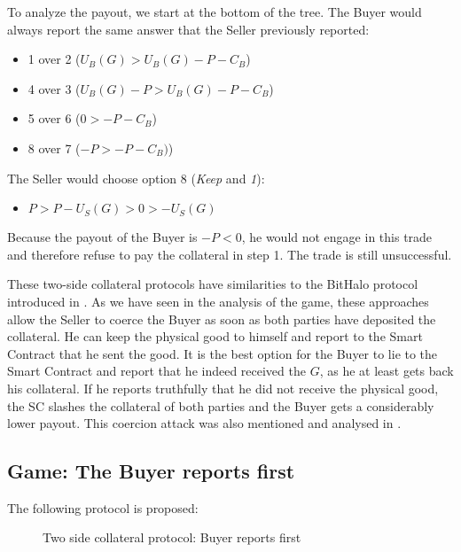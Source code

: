 \documentclass{cacthesis}
\begin{document}
To analyze the payout, we start at the bottom of the tree. The Buyer would always report the same answer that the Seller previously reported:
\begin{itemize}
    \item 1 over 2 ($U_B(G) > U_B(G) -P -C_B$)
    \item 4 over 3 ($U_B(G) - P > U_B(G) -P -C_B$)
    \item 5 over 6 ($0 > -P -C_B$)
    \item 8 over 7 ($-P > -P -C_B)$)
\end{itemize}
The Seller would choose option 8 (\emph{Keep} and \emph{1}):
\begin{itemize}
    \item $P>P-U_S(G)>0>-U_S(G)$
\end{itemize}
Because the payout of the Buyer is $-P<0$, he would not engage in this trade and therefore refuse to pay the collateral in step 1. The trade is still unsuccessful.\newline

These two-side collateral protocols have similarities to the BitHalo protocol introduced in \cite{zimbeck_two_nodate}. As we have seen in the analysis of the game, these approaches allow the Seller to coerce the Buyer as soon as both parties have deposited the collateral. He can keep the physical good to himself and report to the Smart Contract that he sent the good. It is the best option for the Buyer to lie to the Smart Contract and report that he indeed received the $G$, as he at least gets back his collateral. If he reports truthfully that he did not receive the physical good, the SC slashes the collateral of both parties and the Buyer gets a considerably lower payout. This coercion attack was also mentioned and analysed in \cite{goharshady_irrationality_2021}.

\subsection{Game: The Buyer reports first}
The following protocol is proposed:
\begin{figure}[htb!]
    \centering
    \caption{Two side collateral protocol: Buyer reports first}
    \label{pro:two-side-collateral-Buyer-first}
\end{figure}
\end{document}
